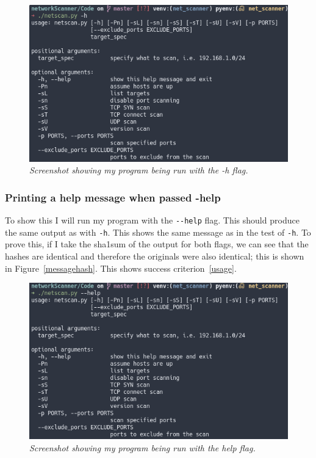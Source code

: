 \documentclass[titlepage]{article}
\let\Oldsubsubsection\subsubsection{}
\renewcommand{\subsubsection}{\FloatBarrier\Oldsubsubsection}
\begin{document}
\begin{figure}[H]
  \centering
  \includegraphics[width=\textwidth]{hmessage.png}
  \caption{\textit{%
    Screenshot showing my program being run with the -h flag.
}}\label{hflagtest}
\end{figure}

\subsubsection{Printing a help message when passed -help}
To show this I will run my program with the \verb|--help| flag.
This should produce the same output as with \verb|-h|.
This shows the same message as in the test of \verb|-h|.
To prove this,
if I take the sha1sum of the output for both flags,
we can see that the hashes are identical and therefore the originals were also identical;
this is shown in Figure~\ref{messagehash}.
This shows success criterion~\ref{usage}.

\begin{figure}[H]
  \centering
  \includegraphics[width=\textwidth]{helpmessage.png}
  \caption{\textit{%
    Screenshot showing my program being run with the help flag.
}}\label{helpflagtest}
\end{figure}
\end{document}
